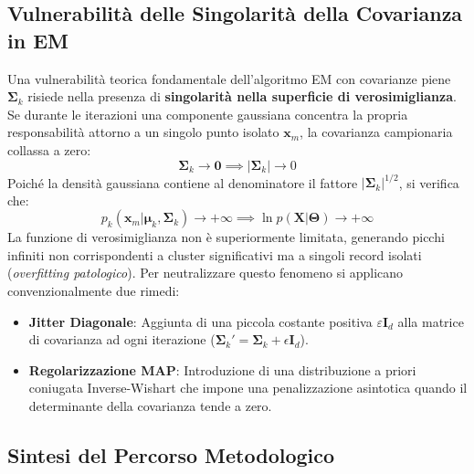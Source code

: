 \subsection{Vulnerabilità delle Singolarità della Covarianza in EM}

Una vulnerabilità teorica fondamentale dell'algoritmo EM con covarianze piene $\boldsymbol{\Sigma}_k$ risiede nella presenza di \textbf{singolarità nella superficie di verosimiglianza}. Se durante le iterazioni una componente gaussiana concentra la propria responsabilità attorno a un singolo punto isolato $\mathbf{x}_m$, la covarianza campionaria collassa a zero:
\begin{equation}
\boldsymbol{\Sigma}_k \to \mathbf{0} \implies |\boldsymbol{\Sigma}_k| \to 0
\end{equation}
Poiché la densità gaussiana contiene al denominatore il fattore $|\boldsymbol{\Sigma}_k|^{1/2}$, si verifica che:
\begin{equation}
p_k(\mathbf{x}_m | \boldsymbol{\mu}_k, \boldsymbol{\Sigma}_k) \to +\infty \implies \ln p(\mathbf{X} | \boldsymbol{\Theta}) \to +\infty
\end{equation}
La funzione di verosimiglianza non è superiormente limitata, generando picchi infiniti non corrispondenti a cluster significativi ma a singoli record isolati (\textit{overfitting patologico}). Per neutralizzare questo fenomeno si applicano convenzionalmente due rimedi:
\begin{itemize}
    \item \textbf{Jitter Diagonale}: Aggiunta di una piccola costante positiva $\varepsilon \mathbf{I}_d$ alla matrice di covarianza ad ogni iterazione ($\boldsymbol{\Sigma}_k' = \boldsymbol{\Sigma}_k + \epsilon \mathbf{I}_d$).
    \item \textbf{Regolarizzazione MAP}: Introduzione di una distribuzione a priori coniugata Inverse-Wishart che impone una penalizzazione asintotica quando il determinante della covarianza tende a zero.
\end{itemize}

\subsection{Sintesi del Percorso Metodologico}

